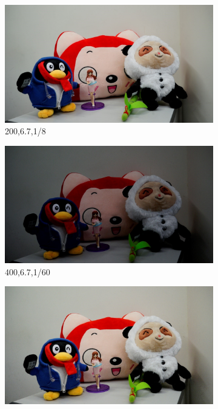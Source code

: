 \begin{figure}
\begin{subfigure}[t]{0.32\textwidth}
        \centering
        \includegraphics[width=1\textwidth]{images/dataset/200_6-7_1-8.jpg}
		\caption{200,6.7,1/8}
    \end{subfigure}
    \hfill
    \begin{subfigure}[t]{0.32\textwidth}
        \centering
        \includegraphics[width=1\textwidth]{images/dataset/400_6-7_1-60.jpg}
		\caption{400,6.7,1/60}
    \end{subfigure}
    \hfill
    \begin{subfigure}[t]{0.32\textwidth}
        \centering
        \includegraphics[width=1\textwidth]{images/dataset/1600_6-7_1-60.jpg}

\end{subfigure}
\end{figure}
